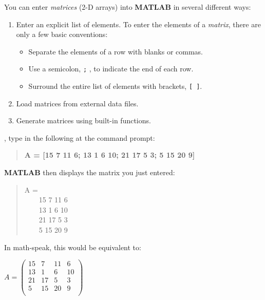 \documentclass{tufte-book} %
\newenvironment{docspec}{\begin{quotation}\ttfamily\parskip0pt\parindent0pt\ignorespaces}{\end{quotation}}
\begin{document}
You can enter \textit{matrices} (2-D arrays) into \textbf{MATLAB} in several different ways:

\begin{enumerate}[noitemsep]
\setlength{\itemindent}{.2in}
\item Enter an explicit list of elements.
To enter the elements of a \textit{matrix}, there are only a few basic conventions:
\begin{itemize}[noitemsep]
\setlength{\itemindent}{.4in}
\item Separate the elements of a row with blanks or commas.
\item Use a semicolon, \texttt{;} , to indicate the end of each row.
\item Surround the entire list of elements with  brackets, \texttt{[ ]}.
\end{itemize}
\item Load matrices from external data files.
\item Generate matrices using built-in functions.
\end{enumerate}

, type in the following at the command prompt:
\begin{docspec}
\textbf{A = [15 7 11 6; 13 1 6 10; 21 17 5 3; 5 15 20 9]}
\end{docspec}
\noindent \textbf{MATLAB} then displays the matrix you just entered:
\begin{docspec}
A =\\
\ \ \ \ 15   7  11   6\\
\ \ \ \ 13   1   6  10\\
\ \ \ \ 21  17   5   3\\
\ \ \ \ 5   15  20   9
\end{docspec}

In math-speak, this would be equivalent to:

\vspace{2mm}
\(A=\begin{pmatrix}15 & 7 & 11 & 6 \\
13 & 1 & 6 & 10 \\
21 & 17 & 5 & 3 \\
5 & 15 & 20 & 9 \\
\end{pmatrix}\)
\vspace{2mm}
\end{document}
